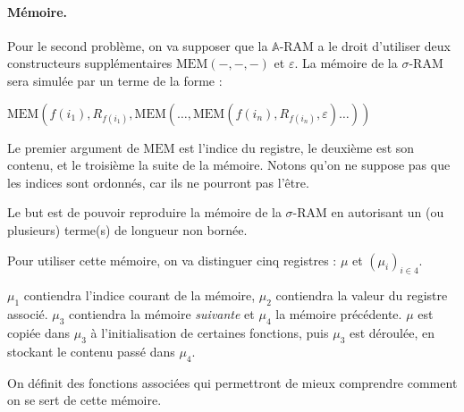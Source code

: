 \documentclass{report}
\newcommand{\bbA}{\mathbb{A}}
\begin{document}
\begin{demo}
					
					\paragraph{Mémoire.}
					\label{par:A_RAM_memoire}
					Pour le second problème, on va supposer que la $\bbA$-RAM a le droit d'utiliser deux constructeurs supplémentaires $\text{MEM}(-,-,-)$ et $\varepsilon$. La mémoire de la $\sigma$-RAM sera simulée par un terme de la forme : 
					
					$\text{MEM}(f(i_1), R_{f(i_1)}, \text{MEM}( \dots, \text{MEM}(f(i_n), R_{f(i_n)}, \varepsilon) \dots ) )$
					
					Le premier argument de $\text{MEM}$ est l'indice du registre, le deuxième est son contenu, et le troisième la suite de la mémoire. Notons qu'on ne suppose pas que les indices sont ordonnés, car ils ne pourront pas l'être. 
					
					Le but est de pouvoir reproduire la mémoire de la $\sigma$-RAM en autorisant un (ou plusieurs) terme(s) de longueur non bornée. 
					
					Pour utiliser cette mémoire, on va distinguer cinq registres : $\mu$ et $\left( \mu_i \right)_{i \in 4}$.
					
					$\mu_1$ contiendra l'indice courant de la mémoire, $\mu_2$ contiendra la valeur du registre associé. $\mu_3$ contiendra la mémoire \emph{suivante} et $\mu_4$ la mémoire précédente. $\mu$ est copiée dans $\mu_3$ à l'initialisation de certaines fonctions, puis $\mu_3$ est déroulée, en stockant le contenu passé dans $\mu_4$. 
					
					On définit des fonctions associées qui permettront de mieux comprendre comment on se sert de cette mémoire. 
					
					
					\begin{algorithm}[H]
						\label{algo:A_RAM_fn_INSERT}
						
						
						

\end{algorithm}
\end{demo}
\end{document}
